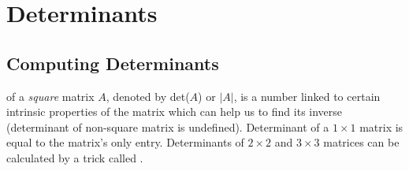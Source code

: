 \section{Determinants}
\label{section:det}
\subsection{Computing Determinants}
 of a \textit{square} matrix $A$, denoted by det($A$) or $|A|$, is a number linked to certain intrinsic properties of the matrix which can help us to find its inverse (determinant of non-square matrix is undefined). Determinant of a $1 \times 1$ matrix is equal to the matrix's only entry. Determinants of $2 \times 2$ and $3 \times 3$ matrices can be calculated by a trick called .
